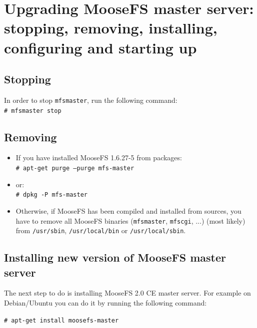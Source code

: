 \documentclass[a4paper,11pt,english]{report}
\def\code#1{\texttt{#1}}
\begin{document}
		\section{Upgrading MooseFS master server: stopping, removing, installing, configuring and starting up}
			\bigskip
			\subsection{Stopping}
			In order to stop \code{mfsmaster}, run the following command: \\ \code{\# mfsmaster stop} 
			
			\bigskip
			\subsection{Removing}
			\begin{itemize}
				\item If you have installed MooseFS 1.6.27-5 from packages: \\ \code{\# apt-get purge --purge mfs-master}
				\item or:\\ \code{\# dpkg -P mfs-master}
				\item Otherwise, if MooseFS has been compiled and installed from sources, you have to remove all MooseFS binaries (\code{mfsmaster}, \code{mfscgi}, ...) (most likely) from \code{/usr/sbin}, \code{/usr/local/bin} or \code{/usr/local/sbin}.
			\end{itemize}
		\bigskip
		\subsection{Installing new version of MooseFS master server}
		The next step to do is installing MooseFS 2.0 CE master server. For example on Debian/Ubuntu you can do it by running the following command:
		
		\bigskip		
		\code{\# apt-get install moosefs-master}
		
		\bigskip
\end{document}
